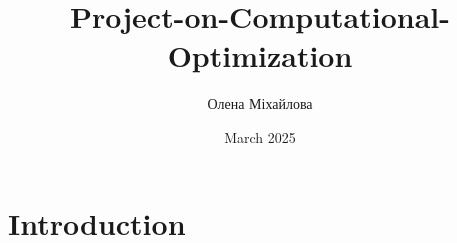 \documentclass{article}
\title{Project-on-Computational-Optimization}
\author{Олена Міхайлова}
\date{March 2025}
\begin{document}
\maketitle

\section{Introduction}
\end{document}
